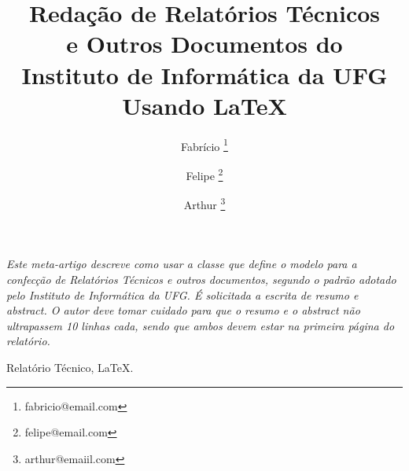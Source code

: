 \documentclass[a4paper, 12pt]{article}
\makeatletter
\newenvironment{resumo}{%
  \list{}{%
    \leftmargin=0.8cm
    \labelwidth=\z@
    \listparindent=\z@
    \itemindent\listparindent
    \rightmargin\leftmargin}\item[\hskip\labelsep
  \bfseries\itshape Resumo.]\itshape}%
{\endlist}
\newenvironment{palavras-chave}{%
  \list{}{%
    \leftmargin=0.8cm
    \labelwidth=\z@
    \listparindent=\z@
    \itemindent\listparindent
    \rightmargin\leftmargin}\item[\hskip\labelsep
  \bfseries Palavras-Chave:]}%
{\endlist}
\makeatother
\begin{document}
%
\title{\bf Redação de Relatórios Técnicos \\e Outros Documentos do
  \\ Instituto de Informática da UFG Usando \LaTeX}

\author{Fabrício \thanks{fabricio@email.com} \and
  Felipe \thanks{felipe@email.com} \and
  Arthur \thanks{arthur@emaiil.com}}
\date{}

\maketitle






\begin{resumo} 
Este meta-artigo descreve como usar a classe que define o modelo para a confecção de Relatórios Técnicos e outros documentos, segundo o padrão adotado pelo Instituto de Informática da UFG. É solicitada a escrita de resumo e \textit{abstract}. O autor deve tomar cuidado para que o resumo e o \textit{abstract} não ultrapassem 10 linhas cada, sendo que ambos devem estar na primeira página do relatório.
\end{resumo}

\begin{palavras-chave}
Relatório Técnico, \LaTeX.
\end{palavras-chave}






% 
\end{document}
